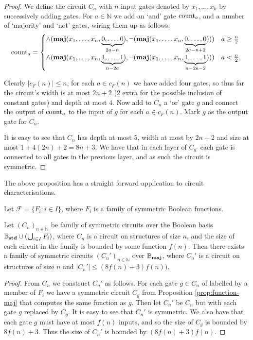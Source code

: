\documentclass[../paper.tex]{subfiles}
\begin{document}
\begin{proof}
  We define the circuit $C_n$ with $n$ input gates denoted by $x_1, \ldots, x_k$
  by successively adding gates. For $a \in \mathbb{N}$ we add an `and' gate
  $\text{count}_a$, and a number of `majority' and `not' gates, wiring them up as
  follows:
\[
  \text{count}_a = \begin{cases} \land ( \text{\textbf{maj}}  ( x_1, \ldots, x_n, \underbrace {0, \ldots,
        0}_{2a - n} ), \neg ( \text{\textbf{maj}} (x_1, \ldots , x_n, \underbrace{0, \ldots,
        0}_{2a - n + 2} ) )) &  a \geq \frac{n}{2} \\
     \land ( \text{\textbf{maj}} ( x_1, \ldots, x_n, \underbrace {1, \ldots, 1}_{n -
           2a} ),  \neg (
      \text{\textbf{maj}} ( x_1, \ldots , x_n, \underbrace{1, \ldots, 1}_{n - 2a -2}
      ) )) & a <
      \frac{n}{2}.
    \end{cases}
  \]
  
  Clearly $\vert c_F(n) \vert \leq n$, for each $a \in c_F(n)$ we have added
  four gates, so thus far the circuit's width is at most $2n + 2$ (2 extra for
  the possible inclusion of constant gates) and depth at most $4$. Now add to
  $C_n$ a `or' gate $g$ and connect the output of $\text{count}_a$ to the input of
  $g$ for each $a \in c_F(n)$. Mark $g$ as the output gate for $C_n$.

  It is easy to see that $C_n$ has depth at most $5$, width at most by $2n + 2$
  and size at most $1 + 4(2n) + 2 = 8n+3$. We have that in each layer of $C_{g'}$
  each gate is connected to all gates in the previous layer, and as such the
  circuit is symmetric.
\end{proof}

The above proposition has a straight forward application to circuit
characterisations.

\begin{thm}
  Let $\mathcal{F} = \{F_i : i \in I \}$, where $F_i$ is a family of symmetric
  Boolean functions.
  
  Let $(C_n)_{n \in \mathbb{N}}$ be family of symmetric circuits over the
  Boolean basis $\mathbb{B}_{\text{\textbf{std}}} \cup (\bigcup_{i \in I} F_i)$, where $C_n$ is
  a circuit on structures of size $n$, and the size of each circuit in the
  family is bounded by some function $f(n)$. Then there exists a family of
  symmetric circuits $(C_n')_{n \in \mathbb{N}}$ over $\mathbb{B}_{\text{\textbf{maj}}}$, where
  $C_n'$ is a circuit on structures of size $n$ and $\vert C_n' \vert \leq
  (8f(n) + 3) f(n))$.
\end{thm}

\begin{proof}
  From $C_n$ we construct $C_n'$ as follows. For each gate $g \in C_n$ of
  labelled by a member of $F_i$ we have a symmetric circuit $C_g$ from
  Proposition \ref{prop:function-maj} that computes the same function as $g$.
  Then let $C_n'$ be $C_n$ but with each gate $g$ replaced by $C_g$. It is easy
  to see that $C_n'$ is symmetric. We also have that each gate $g$ must have at
  most $f(n)$ inputs, and so the size of $C_g$ is bounded by $8f(n) + 3$. Thus
  the size of $C_n'$ is bounded by $(8f(n)+3) f(n)$.
\end{proof}
\end{document}
